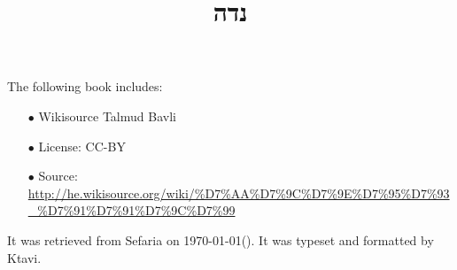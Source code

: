 \documentclass[12pt, openany]{book}
\newcommand{\texttitle}{נדה}\usepackage{titlesec}
\begin{document}
\frontmatter
{}

\title{\texttitle}

\author{}

\date{}

\maketitle

\begin{minipage}[b][\textheight][b]{\textwidth}\englishfont	
	\begin{english}
		\vfill
		The following book includes:
\begin{itemize}
\item[$\bullet$] Wikisource Talmud Bavli
\item[$\bullet$] License: CC-BY
\item[$\bullet$] Source: \url{http://he.wikisource.org/wiki/%D7%AA%D7%9C%D7%9E%D7%95%D7%93_%D7%91%D7%91%D7%9C%D7%99}
\end{itemize}
		It was retrieved from Sefaria on \today\space \texthebrew{(\Hebrewtoday)}.  It was typeset and formatted by Ktavi.
		\clearpage
		
	\end{english}
\end{minipage}


\tableofcontents

\clearpage
\mainmatter
{}
\end{document}

